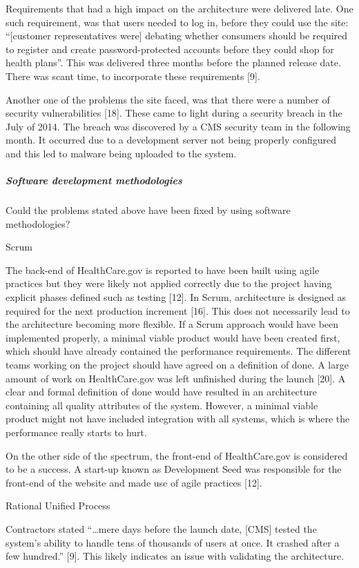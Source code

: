 \documentclass[]{article}
\let\oldsubparagraph\subparagraph
\renewcommand{\subparagraph}[1]{\oldsubparagraph{#1}\mbox{}}
\begin{document}
Requirements that had a high impact on the architecture were delivered
late. One such requirement, was that users needed to log in, before they
could use the site: ``{[}customer representatives were{]} debating
whether consumers should be required to register and create
password-protected accounts before they could shop for health plans''.
This was delivered three months before the planned release date. There
was scant time, to incorporate these requirements {[}9{]}.

Another one of the problems the site faced, was that there were a number
of security vulnerabilities {[}18{]}. These came to light during a
security breach in the July of 2014. The breach was discovered by a CMS
security team in the following month. It occurred due to a development
server not being properly configured and this led to malware being
uploaded to the system.

\subparagraph{Software development
methodologies}\label{software-development-methodologies}

Could the problems stated above have been fixed by using software
methodologies?

Scrum

The back-end of HealthCare.gov is reported to have been built using
agile practices but they were likely not applied correctly due to the
project having explicit phases defined such as testing {[}12{]}. In
Scrum, architecture is designed as required for the next production
increment {[}16{]}. This does not necessarily lead to the architecture
becoming more flexible. If a Scrum approach would have been implemented
properly, a minimal viable product would have been created first, which
should have already contained the performance requirements. The
different teams working on the project should have agreed on a
definition of done. A large amount of work on HealthCare.gov was left
unfinished during the launch {[}20{]}. A clear and formal definition of
done would have resulted in an architecture containing all quality
attributes of the system. However, a minimal viable product might not
have included integration with all systems, which is where the
performance really starts to hurt.

On the other side of the spectrum, the front-end of HealthCare.gov is
considered to be a success. A start-up known as Development Seed was
responsible for the front-end of the website and made use of agile
practices {[}12{]}.

Rational Unified Process

Contractors stated ``\ldots{}mere days before the launch date, {[}CMS{]}
tested the system's ability to handle tens of thousands of users at
once. It crashed after a few hundred.'' {[}9{]}. This likely indicates
an issue with validating the architecture.
\end{document}
